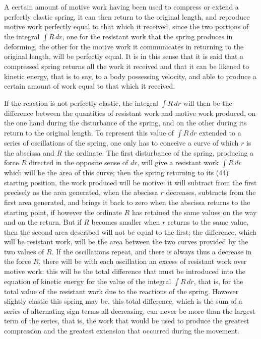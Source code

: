 \documentclass{book}
\begin{document}
A certain amount of motive work having been used to compress or extend a perfectly elastic spring, it can then return to the original length, and reproduce motive work perfectly equal to that which it received, since the two portions of the integral \( \int R \, dr \), one for the resistant work that the spring produces in deforming, the other for the motive work it communicates in returning to the original length, will be perfectly equal. It is in this sense that it is said that a compressed spring returns all the work it received and that it can be likened to kinetic energy, that is to say, to a body possessing velocity, and able to produce a certain amount of work equal to that which it received.

If the reaction is not perfectly elastic, the integral \( \int R \, dr \) will then be the difference between the quantities of resistant work and motive work produced, on the one hand during the disturbance of the spring, and on the other during its return to the original length. To represent this value of \( \int R \, dr \) extended to a series of oscillations of the spring, one only has to conceive a curve of which \( r \) is the abscissa and \( R \) the ordinate. The first disturbance of the spring, producing a force \( R \) directed in the opposite sense of \( dr \), will give a resistant work \( \int R \, dr \) which will be the area of this curve; then the spring returning to its 
\newpage
(44) \\
starting position, the work produced will be motive: it will subtract from the first precisely as the area generated, when the abscissa \( r \) decreases, subtracts from the first area generated, and brings it back to zero when the abscissa returns to the starting point, if however the ordinate \( R \) has retained the same values on the way and on the return.
But if \( R \) becomes smaller when \( r \) returns to the same value, then the second area described will not be equal to the first; the difference, which will be resistant work, will be the area between the two curves provided by the two values of \( R \). If the oscillations repeat, and there is always thus a decrease in the force \( R \), there will be with each oscillation an excess of resistant work over motive work: this will be the total difference that must be introduced into the equation of kinetic energy for the value of the integral \( \int R \, dr \), that is, for the total value of the resistant work due to the reactions of the spring. However slightly elastic this spring may be, this total difference, which is the sum of a series of alternating sign terms all decreasing, can never be more than the largest term of the series, that is, the work that would be used to produce the greatest compression and the greatest extension that occurred during the movement.
\end{document}
